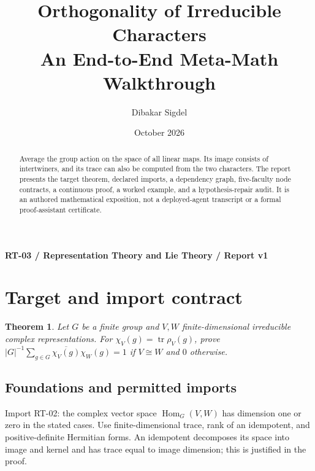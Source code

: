 \documentclass[preprint,12pt,aps,pra,showkeys,amsmath,amssymb,superscriptaddress,floatfix]{revtex4-2}
\newtheorem{theorem}{Theorem}[section]
\theoremstyle{definition}
\theoremstyle{remark}
\begin{document}
\title{Orthogonality of Irreducible Characters\\[4pt]\large An End-to-End Meta-Math Walkthrough}

\author{Dibakar Sigdel}


\date{October 2026}

\begin{abstract}

Average the group action on the space of all linear maps. Its image
consists of intertwiners, and its trace can also be computed from the
two characters. The report presents the target theorem, declared
imports, a dependency graph, five-faculty node contracts, a continuous
proof, a worked example, and a hypothesis-repair audit. It is an
authored mathematical exposition, not a deployed-agent transcript or a
formal proof-assistant certificate.

\end{abstract}\maketitle\linespread{1.12}\selectfont

\noindent\textbf{RT-03 / Representation Theory and Lie Theory / Report v1}

\section{Target and import contract}

\begin{theorem}

Let \(G\) be a finite group and \(V,W\) finite-dimensional irreducible
complex representations. For \(\chi_V(g)=\operatorname{tr}\rho_V(g)\),
prove \(|G|^{-1}\sum_{g\in G}\overline{\chi_V(g)}\chi_W(g)=1\) if
\(V\cong W\) and \(0\) otherwise.

\end{theorem}

\subsection{Foundations and permitted imports}

Import RT-02: the complex vector space \(\operatorname{Hom}_G(V,W)\) has
dimension one or zero in the stated cases. Use finite-dimensional trace,
rank of an idempotent, and positive-definite Hermitian forms. An
idempotent decomposes its space into image and kernel and has trace
equal to image dimension; this is justified in the proof.
\end{document}
